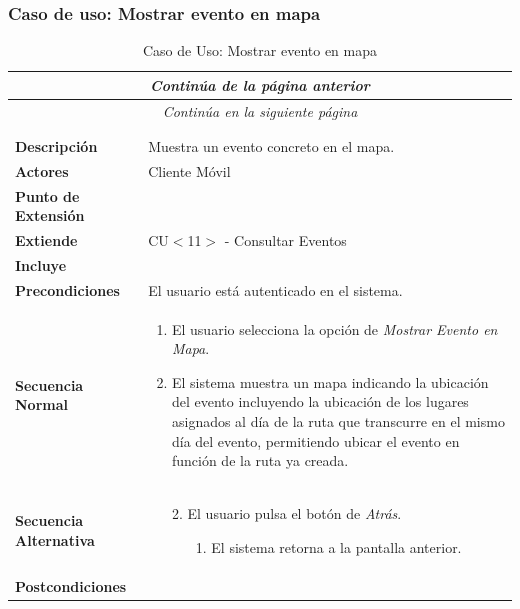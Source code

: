 \subsubsection*{Caso de uso: Mostrar evento en mapa }
\begin{longtable}{| p{4cm} | p{10cm} |}
\endfirsthead
\multicolumn{2}{c}{\textit{Continúa de la página anterior}}\\[12pt]
\hline
\endhead
\hline
\multicolumn{2}{c}{\textit{Continúa en la siguiente página}} \\
\endfoot
\hline
\caption{Caso de Uso: Mostrar evento en mapa}\label{fig:1}\\
\endlastfoot


\hline
\multicolumn{2}{|c|}{\textbf{CU$<$12$>$ - Mostrar Evento en Mapa}} \\

\hline
\textbf{Descripción} &
Muestra un evento concreto en el mapa.\\

\hline
\textbf{Actores} &
Cliente Móvil\\

\hline
\textbf{Punto de Extensión} &
\\

\hline
\textbf{Extiende} &
CU$<$11$>$ - Consultar Eventos
\\

\hline
\textbf{Incluye} &
\\

\hline
\textbf{Precondiciones} &
El usuario está autenticado en el sistema.\\

\hline
\textbf{Secuencia Normal} &\mbox{}\par\vspace{-\baselineskip}
\begin{enumerate}[leftmargin=0.7cm, topsep=0.1cm]
\item El usuario selecciona la opción de \textit{Mostrar Evento en Mapa}.
\item El sistema muestra un mapa indicando la ubicación del evento incluyendo la ubicación de los lugares asignados al día de la ruta que transcurre en el mismo día del evento, permitiendo ubicar el evento en función de la ruta ya creada.
\end{enumerate}
\\
\hline
\textbf{Secuencia Alternativa} &\mbox{}\par\vspace{-\baselineskip}
\begin{enumerate}[leftmargin=0.9cm, topsep=0.1cm]
\item[2.] El usuario pulsa el botón de \textit{Atrás}.
	\begin{itemize}
	\item[1.] El sistema retorna a la pantalla anterior.
	\end{itemize}
\end{enumerate}
\\

\hline
\textbf{Postcondiciones} & \\
\hline
\end{longtable}



